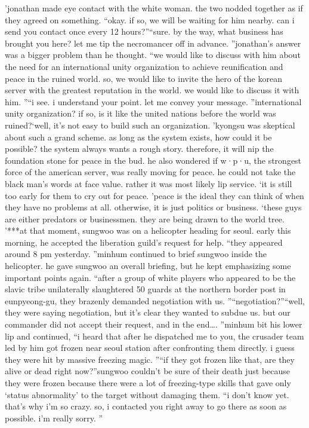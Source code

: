 ’jonathan made eye contact with the white woman.
 the two nodded together as if they agreed on something.
“okay.
 if so, we will be waiting for him nearby.
 can i send you contact once every 12 hours?”“sure.
 by the way, what business has brought you here? let me tip the necromancer off in advance.
”jonathan’s answer was a bigger problem than he thought.
“we would like to discuss with him about the need for an international unity organization to achieve reunification and peace in the ruined world.
 so, we would like to invite the hero of the korean server with the greatest reputation in the world.
 we would like to discuss it with him.
”“i see.
 i understand your point.
 let me convey your message.
”international unity organization? if so, is it like the united nations before the world was ruined?‘well, it’s not easy to build such an organization.
’kyongsu was skeptical about such a grand scheme.
 as long as the system exists, how could it be possible? the system always wants a rough story.
 therefore, it will nip the foundation stone for peace in the bud.
he also wondered if w·p·u, the strongest force of the american server, was really moving for peace.
 he could not take the black man’s words at face value.
 rather it was most likely lip service.
‘it is still too early for them to cry out for peace.
’peace is the ideal they can think of when they have no problems at all.
 otherwise, it is just politics or business.
‘these guys are either predators or businessmen.
 they are being drawn to the world tree.
’***at that moment, sungwoo was on a helicopter heading for seoul.
 early this morning, he accepted the liberation guild’s request for help.
“they appeared around 8 pm yesterday.
”minhum continued to brief sungwoo inside the helicopter.
 he gave sungwoo an overall briefing, but he kept emphasizing some important points again.
“after a group of white players who appeared to be the slavic tribe unilaterally slaughtered 50 guards at the northern border post in eunpyeong-gu, they brazenly demanded negotiation with us.
”“negotiation?”“well, they were saying negotiation, but it’s clear they wanted to subdue us.
 but our commander did not accept their request, and in the end….
”minhum bit his lower lip and continued, “i heard that after he dispatched me to you, the crusader team led by him got frozen near seoul station after confronting them directly.
 i guess they were hit by massive freezing magic.
”“if they got frozen like that, are they alive or dead right now?”sungwoo couldn’t be sure of their death just because they were frozen because there were a lot of freezing-type skills that gave only ‘status abnormality’ to the target without damaging them.
“i don’t know yet.
 that’s why i’m so crazy.
 so, i contacted you right away to go there as soon as possible.
 i’m really sorry.
”

